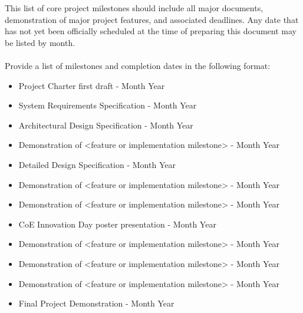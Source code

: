 This list of core project milestones should include all major documents, demonstration of major project features, and associated deadlines. Any date that has not yet been officially scheduled at the time of preparing this document may be listed by month.
\\
\\
Provide a list of milestones and completion dates in the following format:
\begin{itemize}
  \item Project Charter first draft - Month Year
  \item System Requirements Specification - Month Year
  \item Architectural Design Specification - Month Year
  \item Demonstration of <feature or implementation milestone> - Month Year
  \item Detailed Design Specification - Month Year
  \item Demonstration of <feature or implementation milestone> - Month Year
  \item Demonstration of <feature or implementation milestone> - Month Year
  \item CoE Innovation Day poster presentation - Month Year
  \item Demonstration of <feature or implementation milestone> - Month Year
  \item Demonstration of <feature or implementation milestone> - Month Year
  \item Demonstration of <feature or implementation milestone> - Month Year
  \item Final Project Demonstration - Month Year
\end{itemize}